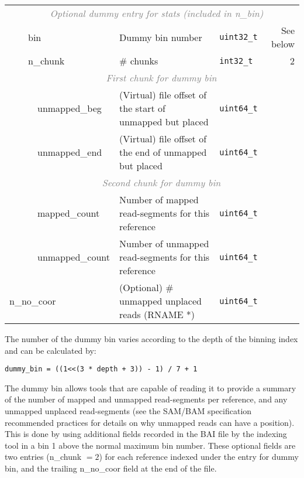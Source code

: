 \documentclass[10pt]{article}
\begin{document}
\begin{table}[ht]
{\begin{tabular}{|l|l|l|l|l|l|r|}
  & \multicolumn{6}{c|}{\textcolor{gray}{\it Optional dummy entry for stats (included in n\_bin)}} \\\cline{3-7}
  & & \multicolumn{2}{l|}{\sf bin} & Dummy bin number & {\tt uint32\_t} & See below \\\cline{3-7}
  & & \multicolumn{2}{l|}{\sf n\_chunk} & \# chunks & {\tt int32\_t} & 2 \\\cline{3-7}
  & & \multicolumn{5}{c|}{\textcolor{gray}{\it First chunk for dummy bin}} \\\cline{4-7}
  & & & {\sf unmapped\_beg} & (Virtual) file offset of the start of unmapped but placed & {\tt uint64\_t} & \\\cline{4-7}
  & & & {\sf unmapped\_end} & (Virtual) file offset of the end of unmapped but placed & {\tt uint64\_t} & \\\cline{4-7}
  & & \multicolumn{5}{c|}{\textcolor{gray}{\it Second chunk for dummy bin}} \\\cline{4-7}
  & & & {\sf mapped\_count} & Number of mapped read-segments for this reference & {\tt uint64\_t} & \\\cline{4-7}
  & & & {\sf unmapped\_count} & Number of unmapped read-segments for this reference & {\tt uint64\_t} & \\\cline{1-7}
  \multicolumn{4}{|l|}{\sf n\_no\_coor} & (Optional) \# unmapped unplaced reads ({\sf RNAME} *) & {\tt uint64\_t} & \\
  \cline{1-7}
\end{tabular}}
\end{table}

The number of the dummy bin varies according to the depth of the binning index and can be
calculated by:

\begin{verbatim}
dummy_bin = ((1<<(3 * depth + 3)) - 1) / 7 + 1
\end{verbatim}

The dummy bin allows tools that are capable of reading it to provide a summary of the number of
mapped and unmapped read-segments per reference, and any unmapped unplaced read-segments
(see the SAM/BAM specification recommended practices for details on why unmapped reads can 
have a position). This is done by using additional fields recorded in the BAI file by the indexing tool 
in a bin 1 above the normal maximum bin number. These optional fields are two entries 
({\sf n\_chunk} $= 2$) for each reference indexed under the entry for dummy {\sf bin}, and the 
trailing {\sf n\_no\_coor} field at the end of the file.
\end{document}
